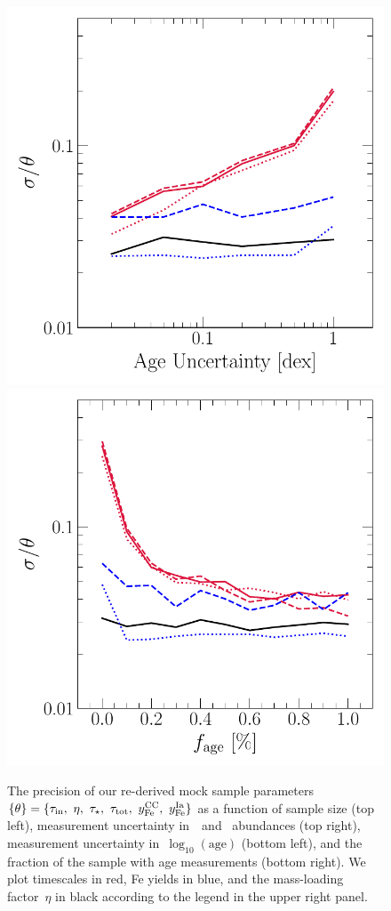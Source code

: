 \documentclass[ms.tex]{subfiles}
\begin{document}
\begin{figure}
\includegraphics[scale = 0.52]{precision_ageuncertainty.pdf}
\includegraphics[scale = 0.52]{precision_agefrac.pdf}
\caption{
The precision of our re-derived mock sample parameters~$\{\theta\} =
\{\tau_\text{in},~\eta,~\tau_\star,~\tau_\text{tot},~y_\text{Fe}^\text{CC},~y_\text{Fe}^\text{Ia}\}$ as a
function of sample size (top left), measurement uncertainty in~\feh~and~\afe
abundances (top right), measurement uncertainty in~$\log_{10}(\text{age})$
(bottom left), and the fraction of the sample with age measurements (bottom
right).
We plot timescales in red, Fe yields in blue, and the mass-loading factor~$\eta$
in black according to the legend in the upper right panel.
}
\label{fig:precision}
\end{figure}
\end{document}
